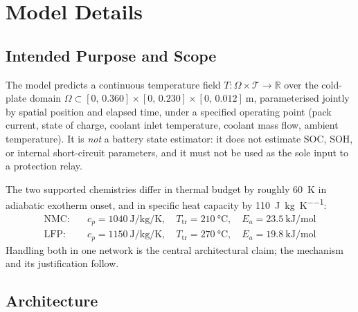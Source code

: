 \documentclass[journal,10pt,compsoc,onecolumn]{IEEEtran}
\begin{document}
\section{Model Details}

\subsection{Intended Purpose and Scope}
\label{sec:details-purpose}

\noindent
The model predicts a continuous temperature field
$T:\Omega\times\mathcal{T}\rightarrow\mathbb{R}$ over the cold-plate domain
$\Omega\subset[0,\,0.360]\times[0,\,0.230]\times[0,\,0.012]\ \si{\metre}$,
parameterised jointly by spatial position and elapsed time, under a specified
operating point (pack current, state of charge, coolant inlet temperature,
coolant mass flow, ambient temperature). It is \emph{not} a battery state
estimator: it does not estimate SOC, SOH, or internal short-circuit
parameters, and it must not be used as the sole input to a protection relay.

\noindent
The two supported chemistries differ in thermal budget by roughly
\SI{60}{\kelvin} in adiabatic exotherm onset, and in specific heat capacity by
\SI{110}{\joule\per\kilo\gram\per\kelvin}:
\begin{align}
\text{NMC:}\quad & c_p=\SI{1040}{\joule\per\kilo\gram\per\kelvin},\quad
T_{\mathrm{tr}}=\SI{210}{\degreeCelsius},\quad
E_a=\SI{23.5}{\kilo\joule\per\mole} \\
\text{LFP:}\quad & c_p=\SI{1150}{\joule\per\kilo\gram\per\kelvin},\quad
T_{\mathrm{tr}}=\SI{270}{\degreeCelsius},\quad
E_a=\SI{19.8}{\kilo\joule\per\mole}
\end{align}
Handling both in one network is the central architectural claim; the
mechanism and its justification follow.

\subsection{Architecture}
\label{sec:details-arch}
\end{document}

